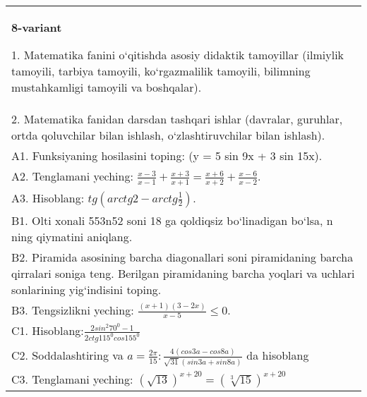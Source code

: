 \documentclass{article}
\begin{document}
\begin{tabular}{m{17cm}}
\textbf{8-variant}

1. Matematika fanini o‘qitishda asosiy didaktik tamoyillar (ilmiylik tamoyili, tarbiya tamoyili, ko‘rgazmalilik tamoyili, bilimning mustahkamligi tamoyili va boshqalar). \\
2. Matematika fanidan darsdan tashqari ishlar (davralar, guruhlar, ortda qoluvchilar bilan ishlash, o‘zlashtiruvchilar bilan ishlash). \\
A1. Funksiyaning hosilasini toping: (y = 5 sin 9x + 3 sin 15x). \\
A2. Tenglamani yeching: \(\frac{x - 3}{x - 1} + \frac{x + 3}{x + 1} = \frac{x + 6}{x + 2} + \frac{x - 6}{x - 2}\). \\
A3. Hisoblang: \(tg\left(arctg2 - arctg\frac{1}{2} \right) \). \\
B1. Olti xonali 553n52 soni 18 ga qoldiqsiz bo‘linadigan bo‘lsa, n ning qiymatini aniqlang. \\
B2. Piramida asosining barcha diagonallari soni piramidaning barcha qirralari soniga teng. Berilgan piramidaning barcha yoqlari va uchlari sonlarining yig‘indisini toping. \\
B3. Tengsizlikni yeching: \(\frac{ (x + 1) (3 - 2x) }{x - 5} \leq 0\). \\
C1. Hisoblang:\(\frac{2sin^{2}70^{0} - 1}{2ctg115^{0}cos155^{0}}\) \\
C2. Soddalashtiring va \(a = \frac{2\pi}{15}:\frac{4 (cos3a - cos8a) }{\sqrt{31} (sin3a + sin8a) }\) da hisoblang \\
C3. Tenglamani yeching: \((\sqrt{13}) ^{x + 20} = (\sqrt[3]{15}) ^{x + 20}\) \\

\end{tabular}
\vspace{1cm}
\end{document}
